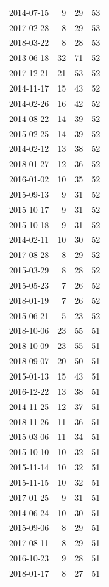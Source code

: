 \begin{tabular}{lrrr}
2014-07-15 & 9 & 29 & 53 \\
2017-02-28 & 8 & 29 & 53 \\
2018-03-22 & 8 & 28 & 53 \\
2013-06-18 & 32 & 71 & 52 \\
2017-12-21 & 21 & 53 & 52 \\
2014-11-17 & 15 & 43 & 52 \\
2014-02-26 & 16 & 42 & 52 \\
2014-08-22 & 14 & 39 & 52 \\
2015-02-25 & 14 & 39 & 52 \\
2014-02-12 & 13 & 38 & 52 \\
2018-01-27 & 12 & 36 & 52 \\
2016-01-02 & 10 & 35 & 52 \\
2015-09-13 & 9 & 31 & 52 \\
2015-10-17 & 9 & 31 & 52 \\
2015-10-18 & 9 & 31 & 52 \\
2014-02-11 & 10 & 30 & 52 \\
2017-08-28 & 8 & 29 & 52 \\
2015-03-29 & 8 & 28 & 52 \\
2015-05-23 & 7 & 26 & 52 \\
2018-01-19 & 7 & 26 & 52 \\
2015-06-21 & 5 & 23 & 52 \\
2018-10-06 & 23 & 55 & 51 \\
2018-10-09 & 23 & 55 & 51 \\
2018-09-07 & 20 & 50 & 51 \\
2015-01-13 & 15 & 43 & 51 \\
2016-12-22 & 13 & 38 & 51 \\
2014-11-25 & 12 & 37 & 51 \\
2018-11-26 & 11 & 36 & 51 \\
2015-03-06 & 11 & 34 & 51 \\
2015-10-10 & 10 & 32 & 51 \\
2015-11-14 & 10 & 32 & 51 \\
2015-11-15 & 10 & 32 & 51 \\
2017-01-25 & 9 & 31 & 51 \\
2014-06-24 & 10 & 30 & 51 \\
2015-09-06 & 8 & 29 & 51 \\
2017-08-11 & 8 & 29 & 51 \\
2016-10-23 & 9 & 28 & 51 \\
2018-01-17 & 8 & 27 & 51 \\

\end{tabular}

